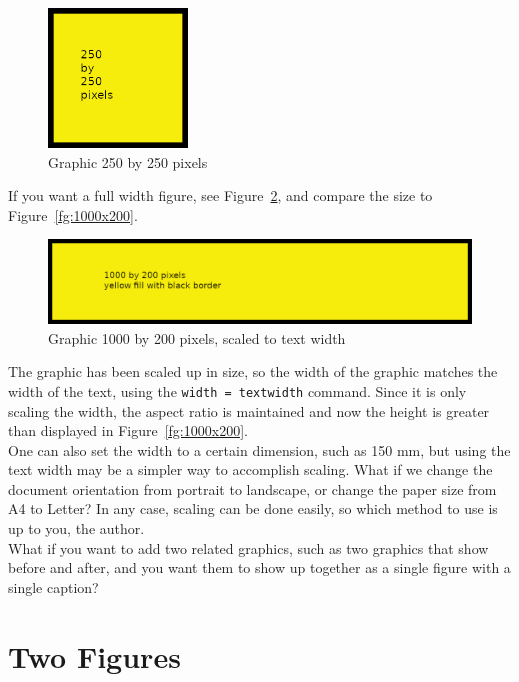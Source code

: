 \begin{figure}[H]
\centering
\includegraphics[width=0.33\textwidth]{250x250}
\caption{Graphic 250 by 250 pixels}\label{fg:250x250-2}
\end{figure}


If you want a full width figure, see Figure~\ref{fg:1000x200-2}, and compare the size to Figure~\ref{fg:1000x200}.

\begin{figure}[H]
\centering
\includegraphics[width=\textwidth]{1000x200}
\caption{Graphic 1000 by 200 pixels, scaled to text width}\label{fg:1000x200-2}
\end{figure}

The graphic has been scaled up in size, so the width of the graphic matches the width of the text, using the \texttt{width = textwidth} command.  Since it is only scaling the width, the aspect ratio is maintained and now the height is greater than displayed in Figure~\ref{fg:1000x200}.\\

One can also set the width to a certain dimension, such as 150 mm, but using the text width may be a simpler way to accomplish scaling.  What if we change the document orientation from portrait to landscape, or change the paper size from A4 to Letter?  In any case, scaling can be done easily, so which method to use is up to you, the author.\\

What if you want to add two related graphics, such as two graphics that show before and after, and you want them to show up together as a single figure with a single caption?

\section{Two Figures}

